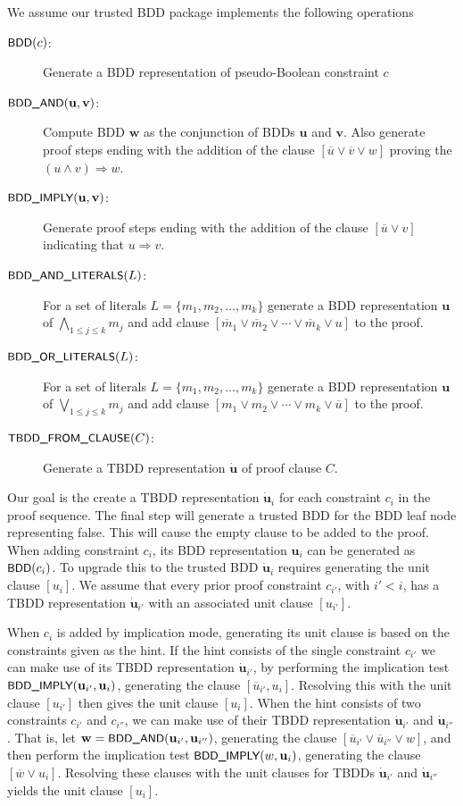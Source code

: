 \documentclass{easychair}
\renewcommand{\obar}[1]{\overline{#1}}
\newcommand{\mlit}{m}
\newcommand{\trust}[1]{\dot {#1}}
\newcommand{\imply}{\Rightarrow}
\newcommand{\fname}[1]{\mbox{\small\sf #1}}
\newcommand{\node}[1]{\mathbf{#1}}
\newcommand{\nodeu}{\node{u}}
\newcommand{\nodev}{\node{v}}
\newcommand{\nodew}{\node{w}}
\begin{document}
We assume our trusted BDD package implements the following operations
\begin{description}
\item[$\fname{BDD}(c)$:] Generate a BDD representation of pseudo-Boolean constraint $c$
\item[$\fname{BDD\_AND}(\nodeu, \nodev)$:] Compute BDD $\nodew$ as the conjunction of BDDs $\nodeu$ and $\nodev$.  Also generate proof steps ending with the addition of the clause $[\obar{u} \lor \obar{v} \lor w]$ proving the $(u \land v) \imply w$.
\item[$\fname{BDD\_IMPLY}(\nodeu, \nodev)$:]
  Generate proof steps ending with the addition of the clause $[\obar{u} \lor v]$ indicating that $u \imply v$.
\item[$\fname{BDD\_AND\_LITERALS}(L)$:] For a set of literals $L = \{\mlit_1, \mlit_2, \ldots, \mlit_k\}$
  generate a BDD representation $\nodeu$ of $\bigwedge_{1 \leq j \leq k} \mlit_j$ and add
  clause $[\obar{\mlit}_1 \lor \obar{\mlit}_2 \lor \cdots \lor \obar{\mlit}_k \lor u]$ to the proof.
\item[$\fname{BDD\_OR\_LITERALS}(L)$:] For a set of literals $L = \{\mlit_1, \mlit_2, \ldots, \mlit_k\}$
  generate a BDD representation $\nodeu$ of $\bigvee_{1 \leq j \leq k} \mlit_j$ and add
  clause $[\mlit_1 \lor \mlit_2 \lor \cdots \lor \mlit_k \lor \obar{u}]$ to the proof.
\item[$\fname{TBDD\_FROM\_CLAUSE}(C)$:] Generate a TBDD representation $\trust{\nodeu}$ of proof clause $C$.
\end{description}

Our goal is the create a TBDD representation $\trust{\nodeu}_i$ for
each constraint $c_i$ in the proof sequence.  The final step will
generate a trusted BDD for the BDD leaf node representing false.  This
will cause the empty clause to be added to the proof.
When adding constraint $c_i$, its BDD
representation $\nodeu_i$ can be generated as $\fname{BDD}(c_i)$.  To upgrade
this to the trusted BDD $\trust{\nodeu}_i$ requires generating the unit clause $[u_i]$.
We assume that every prior proof constraint $c_{i'}$, with $i' < i$, has a TBDD representation $\trust{\nodeu}_{i'}$ with an associated unit clause
$[u_{i'}]$.

When $c_i$ is added by implication mode, generating its unit clause is
based on the constraints given as the hint.
If the hint consists of the
single constraint $c_{i'}$ we can make use of its TBDD representation
$\trust{\nodeu}_{i'}$, by performing the implication test
$\fname{BDD\_IMPLY}(\nodeu_{i'}, \nodeu_i)$, generating the clause
$[\obar{u}_{i'}, u_i]$.  Resolving this with the unit clause
$[u_{i'}]$ then gives the unit clause $[u_i]$.  When the hint consists
of two constraints $c_{i'}$ and $c_{i''}$, we can make use of their
TBDD representation $\trust{\nodeu}_{i'}$ and $\trust{\nodeu}_{i''}$.
That is, let $\nodew = \fname{BDD\_AND}(\nodeu_{i'}, \nodeu_{i''})$,
generating the clause
$[\obar{u}_{i'} \lor \obar{u}_{i''}  \lor w]$, and then
perform the implication test $\fname{BDD\_IMPLY}(w, \nodeu_i)$, generating the clause $[\obar{w} \lor u_i]$.
Resolving these clauses with the unit clauses for TBDDs
$\trust{\nodeu}_{i'}$ and $\trust{\nodeu}_{i''}$
yields the unit clause $[u_i]$.
\end{document}
